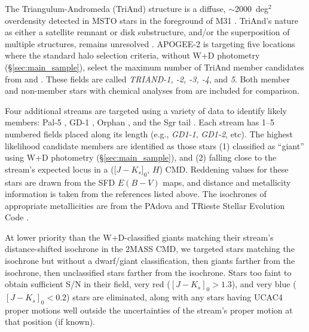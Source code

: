 \documentclass[12pt,twocolumn]{emulateapj}
\begin{document}
The Triangulum-Andromeda (TriAnd) structure is a diffuse, $\sim$2000~deg$^2$ overdensity detected in MSTO stars in the foreground of M31 \citep{Majewski_2004_TriAnd,Rocha-Pinto_2004_TriAnd}.
TriAnd's nature as either a satellite remnant or disk substructure, and/or the superposition of multiple structures, remains unresolved \citep[e.g.,][]{Martin_2007_TriAnd,Chou_2011_TriAndChem,Xu_2015_MWDiskRings,Price-Whelan_2015_TriAnd}.  APOGEE-2 is targeting five locations where the standard halo selection criteria, without W+D photometry (\S\ref{sec:main_sample}), select the maximum number of TriAnd member candidates from \citet{Sheffield_2014_TriAnd} and \citet{Chou_2011_TriAndChem}.  These fields are called {\it TRIAND-1, -2, -3, -4}, and {\it 5}.  Both member and non-member stars with chemical analyses from \citet{Chou_2011_TriAndChem} are included for comparison.

Four additional streams are targeted using a variety of data to identify likely members: Pal-5 \citep{Odenkirchen_2001_Pal5tails,Odenkirchen_2002_Pal5spectra,Odenkirchen_2003_Pal5tails,Odenkirchen_2009_Pal5kinematics,Carlberg_2012_Pal5gaps}, GD-1 \citep{Koposov_2010_GD1}, Orphan \citep{Newberg_2010_orphanstream,Sesar_2013_orphanstreamRRL,Casey_2013_orphanstream,Casey_2014_orphanstream}, and the Sgr tail \citep{Bellazzini_2003_Sgrstream,Yanny_2009_Sgr,Carrell_2012_SgrRCstars,PilaDiez_2014_Sgrwraps}.  Each stream has 1--5 numbered fields placed along its length (e.g., {\it GD1-1}, {\it GD1-2}, etc).  The highest likelihood candidate members are identified as those stars (1) classified as ``giant'' using W+D photometry (\S\ref{sec:main_sample}), and (2) falling close to the stream's expected locus in a ([$J-K_s]_0$, $H$) CMD.  
Reddening values for these stars are drawn from the SFD $E(B-V)$ maps, and distance and metallicity information is taken from the references listed above.  The isochrones of appropriate metallicities are from the PAdova and TRieste Stellar Evolution Code \citep[PARSEC;][]{Bressan_2012_parsec}.

At lower priority than the W+D-classified giants matching their stream's distance-shifted isochrone in the 2MASS CMD, we targeted stars matching the isochrone but without a dwarf/giant classification, then giants farther from the isochrone, then unclassified stars farther from the isochrone.  Stars too faint to obtain sufficient S/N in their field, very red ($[J-K_s]_0>1.3$), and very blue ($[J-K_s]_0<0.2$) stars are eliminated, along with any stars having UCAC4 proper motions well outside the uncertainties of the stream's proper motion at that position (if known).
\end{document}
